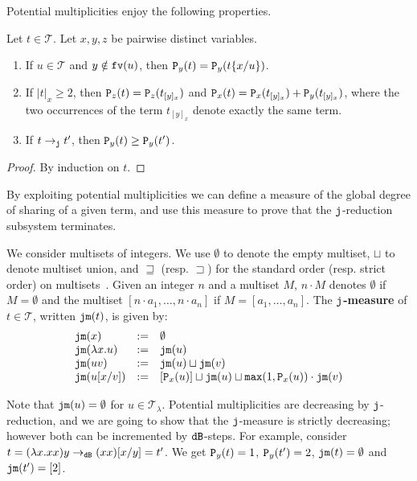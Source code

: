 \documentclass{LMCS}
\renewcommand{\>}{\rightarrow}
\def\lam{\lambda}
\newcommand{\Rew}[1]{\rightarrow_{#1}}
\newcommand{\isubs}[1]{ \{ #1  \} }
\newcommand{\multiset}[1]{ [ #1 ] }
\newcommand{\B}{{\tt dB}}
\newcommand{\dis}{{\tt j}}
\newcommand{\fv}[1]{{\tt fv}(#1)}
\newcommand{\mul}[2]{{\tt P}_{#2}(#1)}
\newcommand{\ems}{\emptyset}
\newcommand{\terms}{\mathcal{T}}
\newcommand{\termslambda}{\terms_{\lam}}
\newcommand{\dm}[1]{\dis {\tt m}(#1)}
\newcommand{\jop}{{\tt j}}
\newcommand{\maxi}[2]{{\tt max}(#1,#2)}
\newcommand{\gm}{\sqsupset}
\newcommand{\geqm}{\sqsupseteq}
\begin{document}
Potential multiplicities enjoy the following properties.

\begin{lem}
\label{l:properties-mul-for-terms}
Let $t \in \terms$. Let $x,y,z$ be pairwise distinct variables.
\begin{enumerate}[\rm(1)]
\item \label{l:pmt-1} If $u \in \terms$ and $y \notin \fv{u}$,
then $\mul{t}{y} =  \mul{t\isubs{x/u}}{y}$.
\item \label{l:pmt-2}  If $|t|_x \geq 2$,
then $\mul{t}{z} =  \mul{t_{[y]_x}}{z}$ and  
$\mul{t}{x} =  \mul{t_{[y]_x}}{x} + \mul{t_{[y]_x}}{y}$, where the two
occurrences of the term $t_{[y]_x}$ denote exactly the same term. 
\item \label{l:pmt-3} 
If  $t \Rew{\dis} t'$, then $\mul{t}{y} \geq   \mul{t'}{y}$.
\end{enumerate}
\end{lem}

\begin{proof}
By induction on $t$.
\end{proof}

By exploiting potential multiplicities we can define a measure of the
global degree of sharing of a given term, and use this
  measure to prove that the $\jop$-reduction subsystem terminates.

We consider multisets of integers. We use $\ems$ to denote the empty
multiset, $\sqcup$ to denote multiset union, and $\geqm$
  (resp. $\gm$) for the standard order (resp. strict order) on
  multisets~\cite{Nipkow-Baader}.  Given an integer
$n$ and a multiset $M$, $n \cdot M$ denotes $\ems$ if $M =\ems$
and the multiset 
$\multiset{n\cdot a_1, \ldots, n\cdot a_n}$ if $M=  \multiset{a_1, \ldots, a_n}$. The
\textbf{$\dis$-measure} of $t \in \terms$, written $\dm{t}$, is given
by:
\[ \begin{array}{llll}
   \dm{x} & := & \ems \\
   \dm{\lam x. u} & := & \dm{u} \\
   \dm{uv} & := & \dm{u} \sqcup  \dm{v} \\
   \dm{u[x/v]} & := & \multiset{\mul{u}{x}} \sqcup \dm{u} \sqcup \maxi{1}{\mul{u}{x}} \cdot \dm{v} \\
   \end{array} \] 

Note that $\dm{u} = \ems$ for $u \in \termslambda$. Potential
multiplicities are 
decreasing by $\dis$-reduction, and we are going to show that the
$\jop$-measure is strictly decreasing; however  both can be incremented by
$\B$-steps. For example, consider $t=(\lam 
  x. x x) y\Rew{\B}(x x)[x/y]=t'$.  We get $\mul{t}{y}=1$,
  $\mul{t'}{y}=2$, $\dm{t}=\emptyset$ and $\dm{t'}=[2]$.
\end{document}
